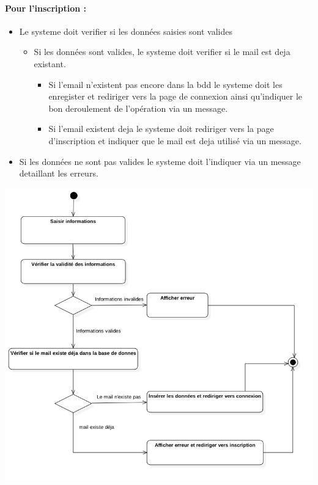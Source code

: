 \documentclass{article}
\begin{document}
\paragraph{Pour l'inscription : }
\begin{itemize}
\item Le systeme doit verifier si les données saisies sont valides
	\begin{itemize}
	\item Si les données sont valides, le systeme doit verifier si le mail
		est deja existant.
		\begin{itemize}
		\item Si l'email n'existent pas encore dans la bdd le systeme
			doit les enregister et rediriger vers la page de connexion
			ainsi qu'indiquer le bon deroulement de l'opération via un message.
		\item Si l'email existent deja le systeme doit rediriger vers
			la page d'inscription et indiquer que le mail est deja utilisé
			via un message.
		\end{itemize}
	\end{itemize}
\item Si les données ne sont pas valides le systeme doit l'indiquer
	via un message detaillant les erreurs.
\end{itemize}

\includegraphics[scale=0.5]{ShematDiagrammes/activiteInscription.jpg}
\end{document}
